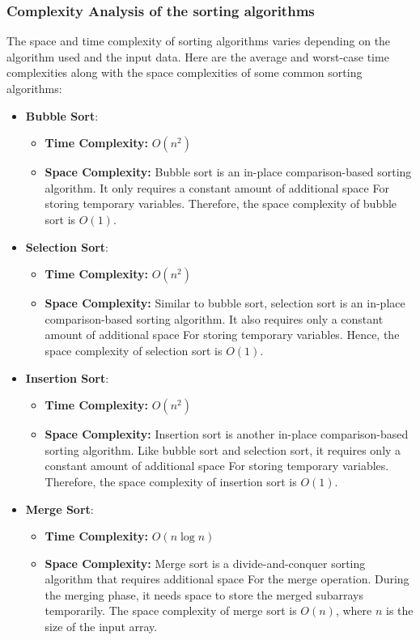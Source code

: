 \documentclass[12pt]{book} %
\begin{document}
\subsubsection{Complexity Analysis of the sorting algorithms}

The space and time complexity of sorting algorithms varies depending on the algorithm used and the input data. Here are the average and worst-case time complexities along with the space complexities of some common sorting algorithms:

\begin{itemize}
    \item \textbf{Bubble Sort}: 
    \begin{itemize}
        \item \textbf{Time Complexity: }$O(n^2)$
        \item \textbf{Space Complexity: }Bubble sort is an in-place comparison-based sorting algorithm. It only requires a constant amount of additional space For storing temporary variables. Therefore, the space complexity of bubble sort is \(O(1)\).
    \end{itemize}
    
    \item \textbf{Selection Sort}: 
    \begin{itemize}
        \item \textbf{Time Complexity: }$O(n^2)$
        \item \textbf{Space Complexity: }Similar to bubble sort, selection sort is an in-place comparison-based sorting algorithm. It also requires only a constant amount of additional space For storing temporary variables. Hence, the space complexity of selection sort is \(O(1)\).
        \end{itemize}
    
    \item \textbf{Insertion Sort}: 
    \begin{itemize}
        \item \textbf{Time Complexity: }$O(n^2)$
        \item \textbf{Space Complexity: }Insertion sort is another in-place comparison-based sorting algorithm. Like bubble sort and selection sort, it requires only a constant amount of additional space For storing temporary variables. Therefore, the space complexity of insertion sort is \(O(1)\).
        \end{itemize}
    
    \item \textbf{Merge Sort}:
    \begin{itemize}
        \item \textbf{Time Complexity: }$O(n \log n)$
        \item \textbf{Space Complexity: }Merge sort is a divide-and-conquer sorting algorithm that requires additional space For the merge operation. During the merging phase, it needs space to store the merged subarrays temporarily. The space complexity of merge sort is \(O(n)\), where \(n\) is the size of the input array.
        \end{itemize}
          

\end{itemize}
\end{document}
